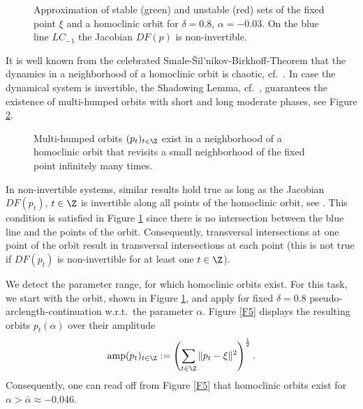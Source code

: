\begin{figure}[H]
\begin{center}
\end{center}
\caption{Approximation of stable (green) and unstable (red) sets of the
  fixed point $\xi$ and a homoclinic orbit for 
  $\delta = 0.8$, $\alpha = -0.03$. On the blue line $LC_{-1}$
  the Jacobian $DF(p)$ is non-invertible.\label{F3}}
\end{figure}

It is well known from the celebrated
Smale-{\v{S}}il'nikov-Birkhoff-Theorem that the dynamics in a
neighborhood of a homoclinic orbit is chaotic, cf.\ \cite{sm67, sh67}.
In case the dynamical system is invertible, the Shadowing Lemma, cf.\
\cite{py99, p00}, guarantees the existence of 
multi-humped orbits with short and long moderate phases, see Figure
\ref{F4}. 

\begin{figure}[H]
\begin{center}
\end{center}
\caption{Multi-humped orbits $(p_t)_{t\in\Z}$ exist 
  in a neighborhood of a homoclinic orbit that revisits a small neighborhood
  of the fixed point infinitely many times.\label{F4}}
\end{figure}

In non-invertible systems, similar results hold true as long as the
Jacobian $DF(p_t)$, $t\in \Z$ is invertible along all points of the
homoclinic orbit, see \cite{sw90, ka94, sa00}. This condition is
satisfied in Figure \ref{F3} since there is no intersection between
the blue line and the points of the orbit. 
Consequently, transversal intersections at
one point of the orbit result in transversal intersections at each
point (this is not true if $DF(p_t)$ is non-invertible for at
least one $t \in \Z$). 

We detect the parameter range, for
which homoclinic orbits exist. For this task, we start with the orbit,
shown in Figure \ref{F3}, and apply for fixed $\delta =
0.8$ pseudo-arclength-continuation \cite{ag90} w.r.t.\ the parameter
$\alpha$. Figure \ref{F5} displays the 
 resulting orbits $p_t(\alpha)$ over their amplitude
$$
\mathrm{amp} (p_t)_{t\in\Z} := \left(\sum_{t\in\Z} \|p_t-\xi\|^2\right)^\frac
12.
$$
Consequently, one can read off from Figure \ref{F5} that homoclinic
orbits exist for $\alpha > \bar \alpha \approx -0.046$.

